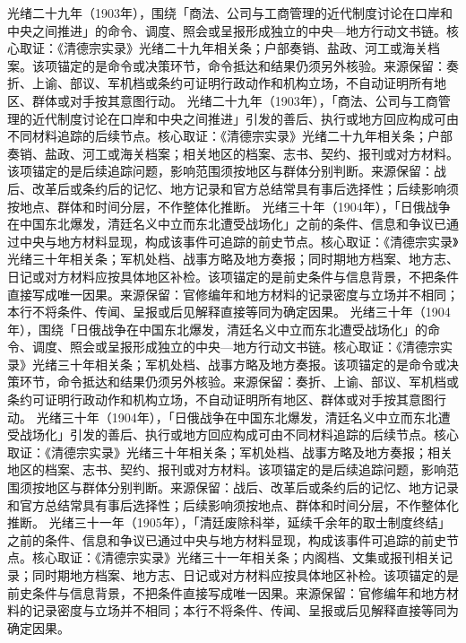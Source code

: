 光绪二十九年（1903年），围绕「商法、公司与工商管理的近代制度讨论在口岸和中央之间推进」的命令、调度、照会或呈报形成独立的中央—地方行动文书链。核心取证：《清德宗实录》光绪二十九年相关条；户部奏销、盐政、河工或海关档案。该项锚定的是命令或决策环节，命令抵达和结果仍须另外核验。来源保留：奏折、上谕、部议、军机档或条约可证明行政动作和机构立场，不自动证明所有地区、群体或对手按其意图行动。
光绪二十九年（1903年），「商法、公司与工商管理的近代制度讨论在口岸和中央之间推进」引发的善后、执行或地方回应构成可由不同材料追踪的后续节点。核心取证：《清德宗实录》光绪二十九年相关条；户部奏销、盐政、河工或海关档案；相关地区的档案、志书、契约、报刊或对方材料。该项锚定的是后续追踪问题，影响范围须按地区与群体分别判断。来源保留：战后、改革后或条约后的记忆、地方记录和官方总结常具有事后选择性；后续影响须按地点、群体和时间分层，不作整体化推断。
光绪三十年（1904年），「日俄战争在中国东北爆发，清廷名义中立而东北遭受战场化」之前的条件、信息和争议已通过中央与地方材料显现，构成该事件可追踪的前史节点。核心取证：《清德宗实录》光绪三十年相关条；军机处档、战事方略及地方奏报；同时期地方档案、地方志、日记或对方材料应按具体地区补检。该项锚定的是前史条件与信息背景，不把条件直接写成唯一因果。来源保留：官修编年和地方材料的记录密度与立场并不相同；本行不将条件、传闻、呈报或后见解释直接等同为确定因果。
光绪三十年（1904年），围绕「日俄战争在中国东北爆发，清廷名义中立而东北遭受战场化」的命令、调度、照会或呈报形成独立的中央—地方行动文书链。核心取证：《清德宗实录》光绪三十年相关条；军机处档、战事方略及地方奏报。该项锚定的是命令或决策环节，命令抵达和结果仍须另外核验。来源保留：奏折、上谕、部议、军机档或条约可证明行政动作和机构立场，不自动证明所有地区、群体或对手按其意图行动。
光绪三十年（1904年），「日俄战争在中国东北爆发，清廷名义中立而东北遭受战场化」引发的善后、执行或地方回应构成可由不同材料追踪的后续节点。核心取证：《清德宗实录》光绪三十年相关条；军机处档、战事方略及地方奏报；相关地区的档案、志书、契约、报刊或对方材料。该项锚定的是后续追踪问题，影响范围须按地区与群体分别判断。来源保留：战后、改革后或条约后的记忆、地方记录和官方总结常具有事后选择性；后续影响须按地点、群体和时间分层，不作整体化推断。
光绪三十一年（1905年），「清廷废除科举，延续千余年的取士制度终结」之前的条件、信息和争议已通过中央与地方材料显现，构成该事件可追踪的前史节点。核心取证：《清德宗实录》光绪三十一年相关条；内阁档、文集或报刊相关记录；同时期地方档案、地方志、日记或对方材料应按具体地区补检。该项锚定的是前史条件与信息背景，不把条件直接写成唯一因果。来源保留：官修编年和地方材料的记录密度与立场并不相同；本行不将条件、传闻、呈报或后见解释直接等同为确定因果。
